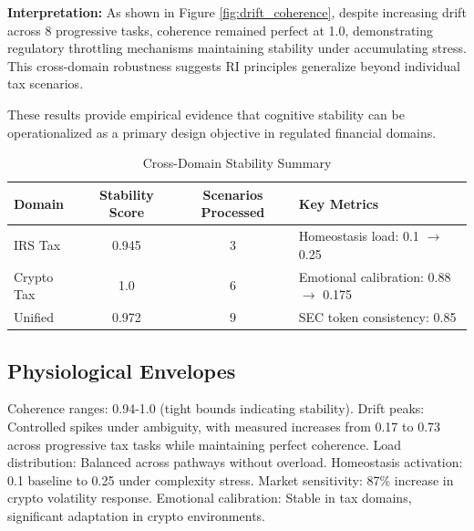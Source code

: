 \documentclass[12pt,a4paper]{article}
\begin{document}
\textbf{Interpretation:} As shown in Figure \ref{fig:drift_coherence}, despite increasing drift across 8 progressive tasks, coherence remained perfect at 1.0, demonstrating regulatory throttling mechanisms maintaining stability under accumulating stress. This cross-domain robustness suggests RI principles generalize beyond individual tax scenarios.

These results provide empirical evidence that cognitive stability can be operationalized as a primary design objective in regulated financial domains.

\begin{table}[H]
\centering
\caption{Cross-Domain Stability Summary}
\label{tab:stability_summary}

\begin{tabular}{@{}l
                c
                c
                p{4.0cm}@{}}
\toprule
\textbf{Domain} &
\textbf{Stability Score} &
\textbf{Scenarios Processed} &
\textbf{Key Metrics} \\
\midrule
IRS Tax     & 0.945 & 3 & Homeostasis load: 0.1 $\rightarrow$ 0.25 \\
Crypto Tax  & 1.0   & 6 & Emotional calibration: 0.88 $\rightarrow$ 0.175 \\
Unified     & 0.972 & 9 & SEC token consistency: 0.85 \\
\bottomrule
\end{tabular}
\end{table}


\subsection{Physiological Envelopes}

Coherence ranges: 0.94-1.0 (tight bounds indicating stability).
Drift peaks: Controlled spikes under ambiguity, with measured increases from 0.17 to 0.73 across progressive tax tasks while maintaining perfect coherence.
Load distribution: Balanced across pathways without overload.
Homeostasis activation: 0.1 baseline to 0.25 under complexity stress.
Market sensitivity: 87\% increase in crypto volatility response.
Emotional calibration: Stable in tax domains, significant adaptation in crypto environments.
\end{document}
